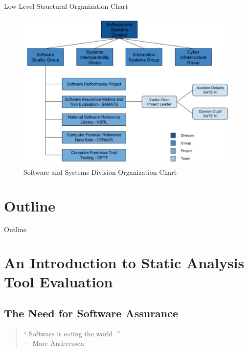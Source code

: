\documentclass[aspectratio=169]{beamer}
\begin{document}
  \begin{frame}{Low Level Structural Organization Chart}
    \begin{figure}
      \centering
      \includegraphics[scale=0.23]{figures/nist-division-organization-chart}
      \caption{Software and Systems Division Organization Chart}
    \end{figure}
  \end{frame}
  
  \section*{Outline}
  \begin{frame}{Outline}
    \tableofcontents[hideallsubsections]
  \end{frame}

  \section{An Introduction to Static Analysis Tool Evaluation}
  
  \subsection{The Need for Software Assurance}
  
  \begin{frame}[standout]
    \begin{quote}
      `` Software is eating the world. ''\\
      --- Marc Andreessen
    \end{quote}
  \end{frame}
  
\end{document}
